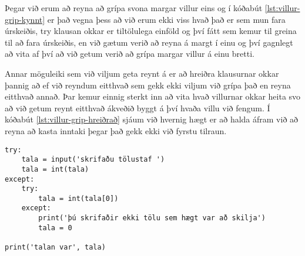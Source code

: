Þegar við erum að reyna að grípa svona margar villur eins og í kóðabút \ref{lst:villur-grip-kynnt} er það vegna þess að við erum ekki viss hvað það er sem mun fara úrskeiðis, try klausan okkar er tiltölulega einföld og því fátt sem kemur til greina til að fara úrskeiðis, en við gætum verið að reyna á margt í einu og því gagnlegt að vita af því að við getum verið að grípa margar villur á einu bretti.


Annar möguleiki sem við viljum geta reynt á er að hreiðra klausurnar okkar þannig að ef við reyndum eitthvað sem gekk ekki viljum við grípa það en reyna eitthvað annað.
Þar kemur einnig sterkt inn að vita hvað villurnar okkar heita svo að við getum reynt eitthvað ákveðið byggt á því hvaða villu við fengum.
Í kóðabút \ref{lst:villur-grip-hreiðrað} sjáum við hvernig hægt er að halda áfram við að reyna að kasta inntaki þegar það gekk ekki við fyrstu tilraun.

\begin{lstlisting}[caption=Hvernig á má hreiðra try - except - else, label=lst:villur-grip-hreiðrað]
try:
	tala = input('skrifaðu tölustaf ')
	tala = int(tala)
except:
	try:
		tala = int(tala[0])
	except:
		print('þú skrifaðir ekki tölu sem hægt var að skilja')
		tala = 0

print('talan var', tala)
\end{lstlisting}

